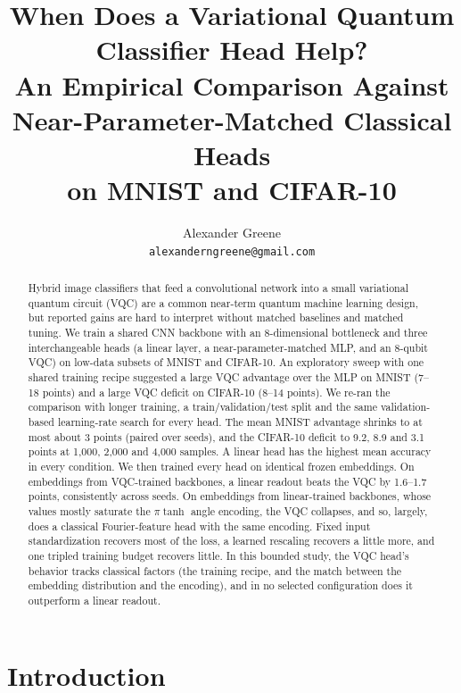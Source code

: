 \documentclass[10pt]{article}
\title{\bf When Does a Variational Quantum Classifier Head Help?\\
\large An Empirical Comparison Against Near-Parameter-Matched Classical Heads\\
on MNIST and CIFAR-10}
\author{%
  Alexander Greene\\
  \texttt{alexanderngreene@gmail.com}\\
}
\date{}
\begin{document}
\maketitle

\begin{abstract}
Hybrid image classifiers that feed a convolutional network into a small
variational quantum circuit (VQC) are a common near-term quantum machine
learning design, but reported gains are hard to interpret without matched
baselines and matched tuning. We train a shared CNN backbone with an
8-dimensional bottleneck and three interchangeable heads (a linear layer, a
near-parameter-matched MLP, and an 8-qubit VQC) on low-data subsets of MNIST
and CIFAR-10. An exploratory sweep with one shared training recipe suggested a
large VQC advantage over the MLP on MNIST (7--18 points) and a large VQC
deficit on CIFAR-10 (8--14 points). We re-ran the comparison with longer
training, a train/validation/test split and the same validation-based
learning-rate search for every head. The mean MNIST advantage shrinks to at
most about 3 points (paired over seeds), and the CIFAR-10 deficit to 9.2, 8.9 and
3.1 points at 1{,}000, 2{,}000 and 4{,}000 samples. A linear head has the highest mean
accuracy in every condition. We then trained every head on identical frozen
embeddings. On embeddings from VQC-trained backbones, a linear readout beats
the VQC by 1.6--1.7 points, consistently across seeds. On embeddings from
linear-trained backbones, whose values mostly saturate the $\pi\tanh$ angle
encoding, the VQC collapses, and so, largely, does a classical Fourier-feature
head with the same encoding. Fixed input standardization recovers most of the
loss, a learned rescaling recovers a little more, and one tripled training
budget recovers little. In this bounded study, the VQC head's behavior tracks
classical factors (the training recipe, and the match between the embedding
distribution and the encoding), and in no selected configuration does it
outperform a linear readout.
\end{abstract}

\section{Introduction}
\end{document}
